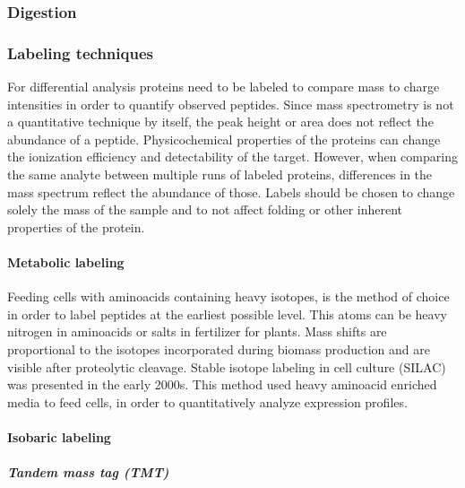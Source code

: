 \documentclass[
  11pt,
]{article}
\begin{document}
\hypertarget{digestion}{%
\subsubsection{Digestion}\label{digestion}}

\hypertarget{labeling-techniques}{%
\subsubsection{Labeling techniques}\label{labeling-techniques}}

For differential analysis proteins need to be labeled to compare mass to
charge intensities in order to quantify observed peptides. Since mass
spectrometry is not a quantitative technique by itself, the peak height
or area does not reflect the abundance of a peptide. Physicochemical
properties of the proteins can change the ionization efficiency and
detectability of the target. However, when comparing the same analyte
between multiple runs of labeled proteins, differences in the mass
spectrum reflect the abundance of those. Labels should be chosen to
change solely the mass of the sample and to not affect folding or other
inherent properties of the protein.

\hypertarget{metabolic-labeling}{%
\paragraph{Metabolic labeling}\label{metabolic-labeling}}

Feeding cells with aminoacids containing heavy isotopes, is the method
of choice in order to label peptides at the earliest possible level.
This atoms can be heavy nitrogen in aminoacids or salts in fertilizer
for plants. Mass shifts are proportional to the isotopes incorporated
during biomass production and are visible after proteolytic cleavage.
Stable isotope labeling in cell culture (SILAC) was presented in the
early 2000s. This method used heavy aminoacid enriched media to feed
cells, in order to quantitatively analyze expression profiles.

\hypertarget{isobaric-labeling}{%
\paragraph{Isobaric labeling}\label{isobaric-labeling}}

\hypertarget{tandem-mass-tag-tmt}{%
\subparagraph{Tandem mass tag (TMT)}\label{tandem-mass-tag-tmt}}
\end{document}
